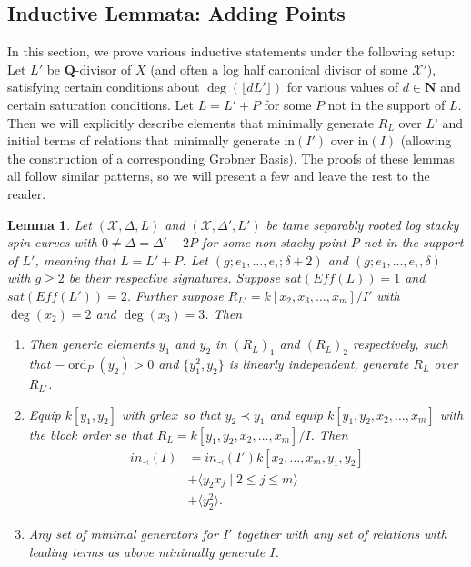 \documentclass{amsart}
\theoremstyle{plain}
\newtheorem{lem}[thm]{Lemma}
\theoremstyle{definition}
\theoremstyle{remark}
\numberwithin{equation}{section}
\newcommand\ssec{\subsection}
\newcommand \sx{\mathscr X}
\DeclareMathOperator{\ord}{ord}
\newcommand \halfcan{L}
\newcommand \initial{\text{in}}
\begin{document}
\ssec{Inductive Lemmata: Adding Points}
\label{ssec:add_pts}
In this section, we prove various inductive statements under the following setup:
Let $\halfcan'$ be $\mathbf{Q}$-divisor of $X$ (and often a log half canonical divisor of some $\sx'$), satisfying certain conditions about $\deg(\lfloor d \halfcan'\rfloor)$ for various values of $d\in\mathbf{N}$ and certain saturation conditions.  Let $\halfcan=\halfcan'+P$ for some $P$ not in the support of $\halfcan$.  Then we will explicitly describe elements that minimally generate $R_\halfcan$ over $\halfcan$' and initial terms of relations that minimally generate $\initial(I')$ over $\initial(I)$ (allowing the construction of a corresponding Grobner Basis).   The proofs of these lemmas all follow similar patterns, so we will present a few  and leave the rest to the reader.


\begin{lem}\label{lem:adding_points_saturation_2_to_1_with_log}
Let $(\sx, \Delta, \halfcan)$ and $(\sx, \Delta', L')$ be tame separably rooted log stacky spin 
curves with $0\ne \Delta=\Delta'+2P$ for some non-stacky point $P$ not in the support of $
\halfcan'$, meaning that $L=L'+P$.  Let $(g; e_1, \ldots, e_\tau; \delta+2)$ and $(g; e_1, 
\ldots, e_\tau, \delta)$ with $g\ge 2$ be their respective signatures.  Suppose 
$sat(Eff(\halfcan))=1$ and $sat(Eff(\halfcan'))=2$.  Further suppose $R_{\halfcan'} = k[x_2, 
x_3, \ldots, x_m]/I'$ with $\deg(x_2) = 2$ and $\deg(x_3) = 3$.  Then
\begin{enumerate}
\item[(a)] Then generic elements $y_1$ and $y_2$ in $(R_{\halfcan})_1$ and $
(R_{\halfcan})_2$ respectively, such that $-\ord_P(y_2)>0$ and $\{y_1^2, y_2\}$ is linearly 
independent, generate $R_\halfcan$ over $R_{\halfcan'}$.
\item[(b)] Equip $k[y_1,y_2]$ with $grlex$ so that $y_2 \prec y_1$ and equip $k[y_1, y_2, 
x_2, \ldots, x_m]$ with the block order so that $R_\halfcan=k[y_1, y_2, x_2, \ldots, x_m]/I$.  
Then
\begin{align*}
			in_\prec(I) &= in_\prec(I')k[x_2, \ldots, x_m, y_1, y_2] \\
			&+\langle y_2 x_j \mid 2 \leq j \leq m \rangle \\
			&+\langle y_2^2\rangle.
		\end{align*}
\item[(c)] Any set of minimal generators for $I'$ together with any set of relations with 
leading terms as above minimally generate $I$.
\end{enumerate}
\end{lem}
\end{document}
